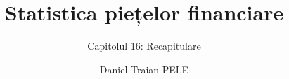 \title[Statistica piețelor financiare]{Statistica piețelor financiare}
\subtitle{Capitolul 16: Recapitulare}
\author[D.T. Pele]{Daniel Traian PELE}
\date{}

\providecommand{\sfmapplink}[3]{\hypertarget{#2}{}\hyperlink{#1}{\beamergotobutton{#3}}}  %
\providecommand{\sfmappback}[2]{\begin{tikzpicture}[remember picture,overlay]\node[anchor=south east] at ([xshift=-3mm,yshift=7mm]current page.south east){\hyperlink{#1}{\beamerreturnbutton{#2}}};\end{tikzpicture}}  %
\providecommand{\sfmchlink}[2]{\href{#1}{#2}}  %
\providecommand{\sfmchlinkt}[2]{\href{#1}{\usebeamercolor[fg]{frametitle}#2}}  %


